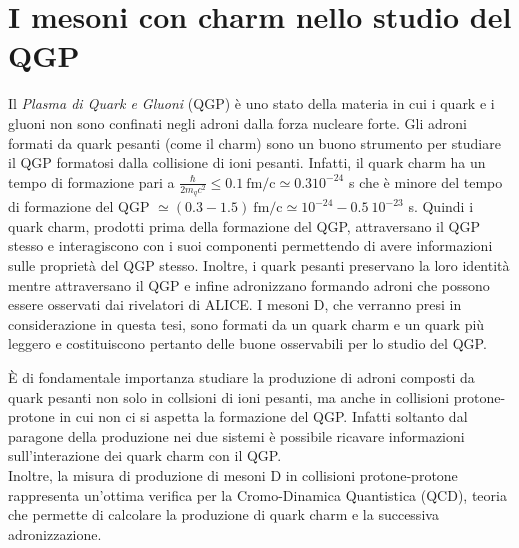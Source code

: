 \section{I mesoni con charm nello studio del QGP}
Il \textit{Plasma di Quark e Gluoni} (QGP) è uno stato della materia in cui i quark e i gluoni non sono confinati negli adroni dalla forza nucleare forte. Gli adroni formati da quark pesanti (come il charm) sono un buono strumento per studiare il QGP formatosi dalla collisione di ioni pesanti. Infatti, il quark charm ha un tempo di formazione pari a $\frac{\hbar}{2m_qc^2} \leq 0.1 \ \mathrm{fm/c} \simeq 0.3 10^{-24}$ s che \`e minore del tempo di formazione del QGP $\simeq (0.3 - 1.5) \ \mathrm{fm/c} \simeq 10^{-24} - 0.5 \ 10^{-23}$ s. Quindi i quark charm, prodotti prima della formazione del QGP, attraversano il QGP stesso e interagiscono con i suoi componenti permettendo di avere informazioni sulle propriet\`a del QGP stesso. Inoltre, i quark pesanti preservano la loro identit\`a mentre attraversano il QGP e infine adronizzano formando adroni che possono essere osservati dai rivelatori di ALICE. I mesoni D, che verranno presi in considerazione in questa tesi, sono formati da un quark charm e un quark pi\`u leggero e costituiscono pertanto delle buone osservabili per lo studio del QGP. 

È di fondamentale importanza studiare la produzione di adroni composti da quark pesanti non solo in collsioni di ioni pesanti, ma anche in collisioni protone-protone in cui non ci si aspetta la formazione del QGP.
Infatti soltanto dal paragone della produzione nei due sistemi \`e possibile ricavare informazioni sull'interazione dei quark charm con il QGP. 
\\Inoltre, la misura di produzione di mesoni D in collisioni protone-protone rappresenta un'ottima verifica per la Cromo-Dinamica Quantistica (QCD), teoria che permette di calcolare la produzione di quark charm e la successiva adronizzazione.

